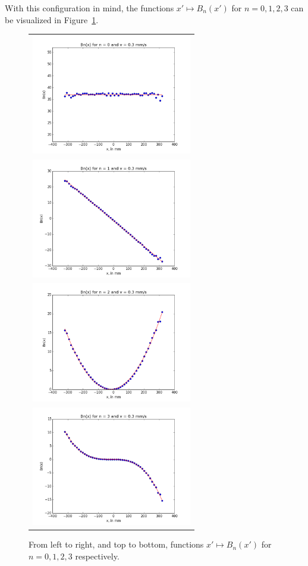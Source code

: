 \documentclass[9pt,technote]{IEEEtran}
\numberwithin{equation}{section}
\begin{document}
With this configuration in mind, the functions $x' \mapsto B_n(x')$ for $n = 0,1,2,3$ can be visualized in Figure~\ref{fig:Bnx}.
\begin{figure}[!ht]
	\centering
	\begin{tabular}{c}
	\includegraphics[width=7cm]{figs/B0.png} \\
	\includegraphics[width=7cm]{figs/B1.png} \\
	\includegraphics[width=7cm]{figs/B2.png} \\
	\includegraphics[width=7cm]{figs/B3.png} 
	\end{tabular}
	\caption{From left to right, and top to bottom, functions $x' \mapsto B_n(x')$ for $n = 0,1,2,3$ respectively.\label{fig:Bnx}}
\end{figure}





\end{document}
